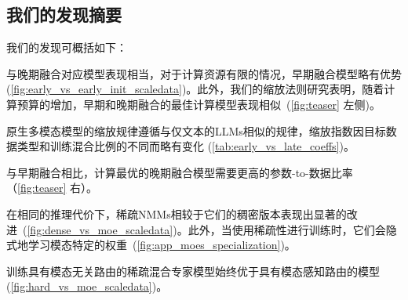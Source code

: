 

\subsection{我们的发现摘要}
我们的发现可概括如下：

 
与晚期融合对应模型表现相当，对于计算资源有限的情况，早期融合模型略有优势 (\cref{fig:early_vs_early_init_scaledata})。此外，我们的缩放法则研究表明，随着计算预算的增加，早期和晚期融合的最佳计算模型表现相似~(\cref{fig:teaser} 左侧)。

 原生多模态模型的缩放规律遵循与仅文本的LLMs相似的规律，缩放指数因目标数据类型和训练混合比例的不同而略有变化 (\cref{tab:early_vs_late_coeffs})。

与早期融合相比，计算最优的晚期融合模型需要更高的参数-to-数据比率（\cref{fig:teaser} 右）。

 在相同的推理代价下，稀疏NMMs相较于它们的稠密版本表现出显著的改进~(\cref{fig:dense_vs_moe_scaledata})。此外，当使用稀疏性进行训练时，它们会隐式地学习模态特定的权重~(\cref{fig:app_moes_specialization})。 

 训练具有模态无关路由的稀疏混合专家模型始终优于具有模态感知路由的模型 (\cref{fig:hard_vs_moe_scaledata})。


\vspace{-5pt}




